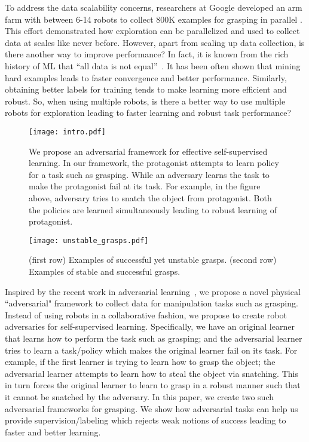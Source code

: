 \documentclass[letterpaper, 10 pt, conference]{ieeeconf}  %
\begin{document}
To address the data scalability concerns, researchers at Google developed an arm farm with between 6-14 robots to collect 800K examples for grasping in parallel \cite{levine2016learning}. This  effort demonstrated how exploration can be parallelized and used to collect data at scales like never before. However, apart from scaling up data collection, is there another way to improve performance? In fact, it is known from the rich history of ML that ``all data is not equal''~\cite{sung1994learning, rowley1998neural}. It has been often shown that mining hard examples leads to faster convergence and better performance. Similarly, obtaining better labels for training tends to make learning more efficient and robust. So, when using multiple robots, is there a better way to use multiple robots for exploration leading to faster learning and robust task performance? 

\begin{figure}[t!]
\begin{center}
\texttt{[image: intro.pdf]}
\end{center}
\caption{We propose an adversarial framework for effective self-supervised learning. In our framework, the protagonist attempts to learn policy for a task such as grasping. While an adversary learns the task to make the protagonist fail at its task. For example, in the figure above, adversary tries to snatch the object from protagonist. Both the policies are learned simultaneously leading to robust learning of protagonist.}
\label{fig:intro_fig}
\end{figure}\begin{figure}[t!]
\begin{center}
\texttt{[image: unstable\_grasps.pdf]}
\end{center}
\caption{ (first row) Examples of successful yet unstable grasps. (second row) Examples of stable and successful grasps.}
\label{fig:unstable}
\end{figure}

Inspired by the recent work in adversarial learning~\cite{goodfellow2014generative, dumoulin2016adversarially}, we propose a novel physical ``adversarial" framework to collect data for manipulation tasks such as grasping. Instead of using robots in a collaborative fashion, we propose to create robot adversaries for self-supervised learning. Specifically, we have an original learner that learns how to perform the task such as grasping; and the adversarial learner tries to learn a task/policy which makes the original learner fail on its task. For example, if the first learner is trying to learn how to grasp the object; the adversarial learner attempts to learn how to steal the object via snatching. This in turn forces the original learner to learn to grasp in a robust manner such that it cannot be snatched by the adversary. In this paper, we create two such adversarial frameworks for grasping. We show how adversarial tasks can help us provide supervision/labeling which rejects weak notions of success leading to faster and better learning.
\end{document}
